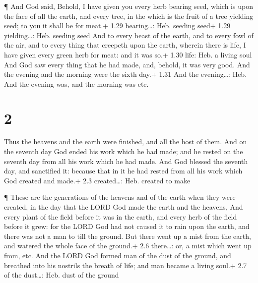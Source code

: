  ¶ And God said, Behold, I have given you every herb
bearing seed, which is upon the face of all the earth, and every tree,
in the which is the fruit of a tree yielding seed; to you it shall be
for meat.+ 1.29 bearing\ldots: Heb. seeding seed+ 1.29 yielding\ldots:
Heb. seeding seed  And to every beast of the earth, and to
every fowl of the air, and to every thing that creepeth upon the earth,
wherein there is life, I have given every green herb for meat: and it
was so.+ 1.30 life: Heb. a living soul  And God saw every
thing that he had made, and, behold, it was very good. And the evening
and the morning were the sixth day.+ 1.31 And the evening\ldots: Heb.
And the evening was, and the morning was etc.

\hypertarget{section-1}{%
\section{2}\label{section-1}}

 Thus the heavens and the earth were finished, and all the
host of them.  And on the seventh day God ended his work
which he had made; and he rested on the seventh day from all his work
which he had made.  And God blessed the seventh day, and
sanctified it: because that in it he had rested from all his work which
God created and made.+ 2.3 created\ldots: Heb. created to make

 ¶ These are the generations of the heavens and of the earth
when they were created, in the day that the LORD God made the earth and
the heavens,  And every plant of the field before it was in
the earth, and every herb of the field before it grew: for the LORD God
had not caused it to rain upon the earth, and there was not a man to
till the ground.  But there went up a mist from the earth,
and watered the whole face of the ground.+ 2.6 there\ldots: or, a mist
which went up from, etc.  And the LORD God formed man of the
dust of the ground, and breathed into his nostrils the breath of life;
and man became a living soul.+ 2.7 of the dust\ldots: Heb. dust of the
ground

